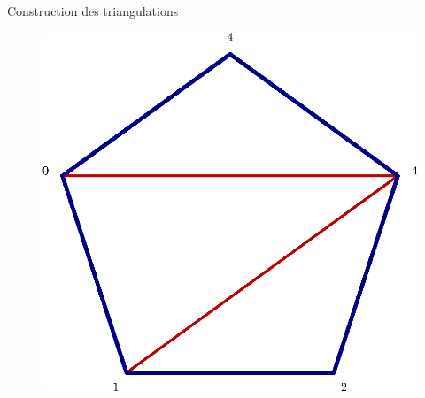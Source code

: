 \documentclass[french,xcolor=dvipsnames]{beamer}
\begin{document}
\begin{frame}{Construction des triangulations}
\begin{figure}
				\includegraphics[scale=0.2]{triangu_5.eps}
			\end{figure}
		\end{frame}
\end{document}
